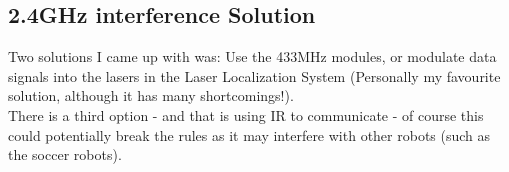 				\subsection{2.4GHz interference Solution}
                    \index{}
					Two solutions I came up with was: Use the 433MHz modules, or modulate data signals into the lasers in the Laser Localization System (Personally my favourite solution, although it has many shortcomings!).\\
					
					There is a third option - and that is using IR to communicate - of course this could potentially break the rules as it may interfere with other robots (such as the soccer robots).\\

